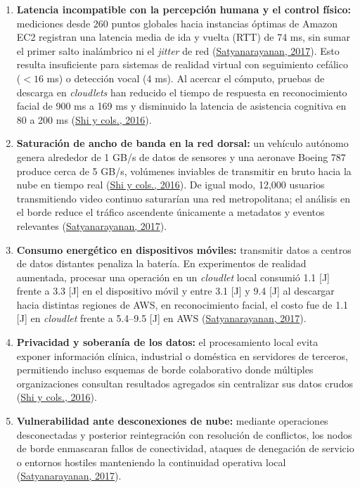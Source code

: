 \documentclass[12pt, letterpaper]{article}
\begin{document}
\begin{enumerate}
    \item \textbf{Latencia incompatible con la percepción humana y el control físico:} mediciones desde 260 puntos globales hacia instancias óptimas de Amazon EC2 registran una latencia media de ida y vuelta (RTT) de 74 ms, sin sumar el primer salto inalámbrico ni el \textit{jitter} de red (\protect\hyperlink{satyanarayanan2017}{Satyanarayanan, 2017}). Esto resulta insuficiente para sistemas de realidad virtual con seguimiento cefálico ($<16$ ms) o detección vocal (4 ms). Al acercar el cómputo, pruebas de descarga en \textit{cloudlets} han reducido el tiempo de respuesta en reconocimiento facial de 900 ms a 169 ms y disminuido la latencia de asistencia cognitiva en 80 a 200 ms (\protect\hyperlink{shi2016}{Shi y cols., 2016}).
    \item \textbf{Saturación de ancho de banda en la red dorsal:} un vehículo autónomo genera alrededor de 1 GB/s de datos de sensores y una aeronave Boeing 787 produce cerca de 5 GB/s, volúmenes inviables de transmitir en bruto hacia la nube en tiempo real (\protect\hyperlink{shi2016}{Shi y cols., 2016}). De igual modo, 12,000 usuarios transmitiendo video continuo saturarían una red metropolitana; el análisis en el borde reduce el tráfico ascendente únicamente a metadatos y eventos relevantes (\protect\hyperlink{satyanarayanan2017}{Satyanarayanan, 2017}).
    \item \textbf{Consumo energético en dispositivos móviles:} transmitir datos a centros de datos distantes penaliza la batería. En experimentos de realidad aumentada, procesar una operación en un \textit{cloudlet} local consumió 1.1 [J] frente a 3.3 [J] en el dispositivo móvil y entre 3.1 [J] y 9.4 [J] al descargar hacia distintas regiones de AWS, en reconocimiento facial, el costo fue de 1.1 [J] en \textit{cloudlet} frente a 5.4--9.5 [J] en AWS (\protect\hyperlink{satyanarayanan2017}{Satyanarayanan, 2017}).
    \item \textbf{Privacidad y soberanía de los datos:} el procesamiento local evita exponer información clínica, industrial o doméstica en servidores de terceros, permitiendo incluso esquemas de borde colaborativo donde múltiples organizaciones consultan resultados agregados sin centralizar sus datos crudos (\protect\hyperlink{shi2016}{Shi y cols., 2016}).
    \item \textbf{Vulnerabilidad ante desconexiones de nube:} mediante operaciones desconectadas y posterior reintegración con resolución de conflictos, los nodos de borde enmascaran fallos de conectividad, ataques de denegación de servicio o entornos hostiles manteniendo la continuidad operativa local (\protect\hyperlink{satyanarayanan2017}{Satyanarayanan, 2017}).
\end{enumerate}
\end{document}
